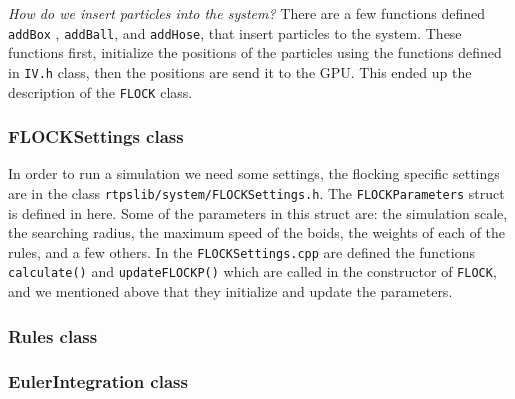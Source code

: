 \textit{How do we insert particles into the system?} There are a few functions defined \texttt{addBox} , \texttt{addBall}, and \texttt{addHose}, that insert particles to the system. These functions first, initialize the positions of the particles using the functions defined in \texttt{IV.h} class, then the positions are send it to the GPU. This ended up the description of the \texttt{FLOCK} class.
 
\subsubsection{FLOCKSettings class}
In order to run a simulation we need some settings, the flocking specific settings are in the class \texttt{rtpslib/system/FLOCKSettings.h}. The \texttt{FLOCKParameters} struct is defined in here. Some of the parameters in this struct are: the simulation scale, the searching radius, the maximum speed of the boids, the weights of each of the rules, and a few others. In the \texttt{FLOCKSettings.cpp} are defined the functions \texttt{calculate()} and \texttt{updateFLOCKP()} which are called in the constructor of \texttt{FLOCK}, and we mentioned above that they initialize and update the parameters.

\subsubsection{Rules class}

\subsubsection{EulerIntegration class}

